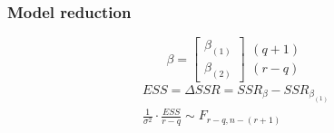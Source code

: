 \documentclass[aspectratio=169,10pt,t]{beamer}
\begin{document}
\begin{frame}[t]
	\frametitle{Model reduction}

	\[
	\beta
	=
	\begin{bmatrix}
		\beta_{ \left( 1 \right) }\\
		\beta_{ \left( 2 \right) }
	\end{bmatrix}
	\begin{matrix}
		\left( q+1 \right) \\
		\left( r-q \right) 
	\end{matrix}
	\] 
	\pause
	\[
		\begin{gathered}
		ESS = \Delta SSR =
		SSR_{\beta} 
		-
		SSR_{\beta_{ \left( 1 \right) }} \\
		\frac{1}{ \sigma^{2}} 
		\cdot
		\frac{ESS}{r-q} 
		\sim
		F_{r-q,n- \left( r+1 \right) }
		\end{gathered}
	\] 

\end{frame}
\end{document}
